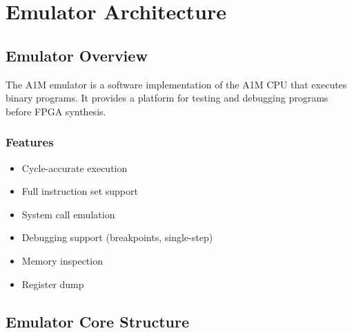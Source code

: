 \documentclass[12pt,a4paper,oneside]{book}
\begin{document}
\chapter{Emulator Architecture}

\section{Emulator Overview}

The A1M emulator is a software implementation of the A1M CPU that executes binary programs. It provides a platform for testing and debugging programs before FPGA synthesis.

\subsection{Features}

\begin{itemize}
    \item Cycle-accurate execution
    \item Full instruction set support
    \item System call emulation
    \item Debugging support (breakpoints, single-step)
    \item Memory inspection
    \item Register dump
\end{itemize}

\section{Emulator Core Structure}
\end{document}

